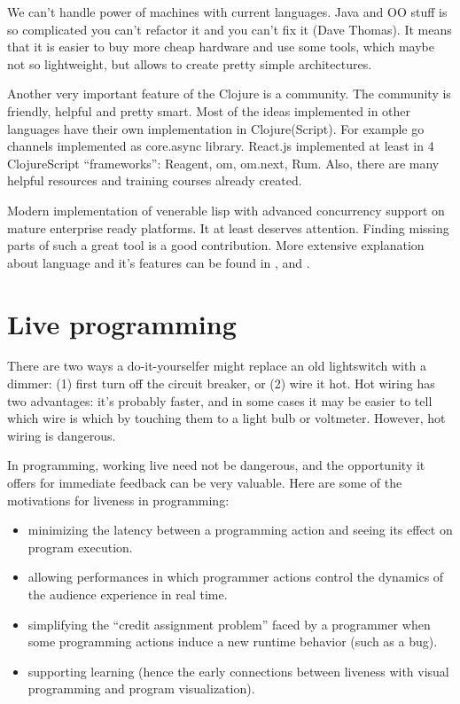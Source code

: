 We can't handle power of machines with current languages. Java and OO stuff is
so complicated you can't refactor it and you can't fix it (Dave Thomas). It
means that it is easier to buy more cheap hardware and use some tools, which
maybe not so lightweight, but allows to create pretty simple architectures.

Another very important feature of the Clojure is a community. The community is
friendly, helpful and pretty smart. Most of the ideas implemented in other
languages have their own implementation in Clojure(Script). For example go
channels implemented as core.async library. React.js implemented at least in 4
ClojureScript “frameworks”: Reagent, om, om.next, Rum. Also, there are many
helpful resources and training courses already created.

Modern implementation of venerable lisp with advanced concurrency support on
mature enterprise ready platforms. It at least deserves attention. Finding
missing parts of such a great tool is a good contribution. More extensive
explanation about language and it's features can be found in
\cite{halloway2009programming}, \cite{fogus2011joy} and
\cite{hickey2008clojure}.


\section{Live programming}

There are two ways a do-it-yourselfer might replace an old lightswitch with a
dimmer: (1) first turn off the circuit breaker, or (2) wire it hot. Hot wiring
has two advantages: it’s probably faster, and in some cases it may be easier to
tell which wire is which by touching them to a light bulb or voltmeter. However,
hot wiring is dangerous.

In programming, working live need not be dangerous, and the opportunity it
offers for immediate feedback can be very valuable. Here are some of the
motivations for liveness in programming:

\begin{itemize}
\item minimizing the latency between a programming action and seeing its effect
  on program execution.
\item allowing performances in which programmer actions control the dynamics of
  the audience experience in real time.
\item simplifying the “credit assignment problem” faced by a programmer when
  some programming actions induce a new runtime behavior (such as a bug).
\item supporting learning (hence the early connections between liveness with
  visual programming and program visualization).
\end{itemize}


